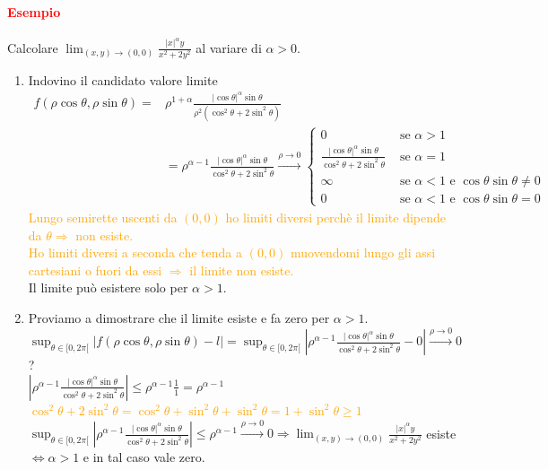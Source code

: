\documentclass{article}
\begin{document}
\paragraph{\textcolor{red}{Esempio}}
Calcolare $\lim_{(x,y)\rightarrow(0,0)}\frac{|x|^\alpha y}{x^2+2y^2}$ al variare di $\alpha >0$.
\begin{enumerate}
    \item Indovino il candidato valore limite
    \begin{align*}
        f(\rho\cos\theta,\rho\sin\theta)=&\rho^{1+\alpha}\frac{|\cos\theta|^\alpha\sin\theta}{\rho^2(\cos^2\theta+2\sin^2\theta)}\\
        &=\rho^{\alpha-1}\frac{|\cos\theta|^\alpha \sin\theta}{\cos^2\theta+2\sin^2\theta}\xrightarrow{\rho\rightarrow0}\begin{cases}
        0 &\text{  se  } \alpha > 1\\
         \frac{|\cos\theta|^\alpha \sin \theta}{\cos^2\theta+2\sin^2\theta}&\text{  se  } \alpha=1\\
        \infty &\text{  se  } \alpha < 1 \text{  e   } \cos\theta \sin\theta \neq 0\\
        0 &\text{  se  } \alpha < 1  \text{  e   } \cos\theta \sin\theta = 0
    \end{cases}
    \end{align*}
\textcolor{orange}{Lungo semirette uscenti da $(0,0)$ ho limiti diversi perchè il limite dipende da $\theta \Rightarrow$ non esiste.\\Ho limiti diversi a seconda che tenda a $(0,0)$ muovendomi lungo gli assi cartesiani o fuori da essi $\Rightarrow$ il limite non esiste.}\\
Il limite può esistere solo per $\alpha > 1$.
\item Proviamo a dimostrare che il limite esiste e fa zero per $\alpha >1$.\\
$\sup_{\theta \in [0,2\pi[}|f(\rho\cos\theta,\rho\sin\theta)-l|=\sup_{\theta \in [0,2\pi[}|\rho^{\alpha-1}\frac{|\cos \theta|^\alpha \sin\theta}{\cos^2\theta+2\sin^2\theta}-0|\xrightarrow{\rho\rightarrow0}0$?\\
$ |\rho^{\alpha-1}\frac{|\cos \theta|^\alpha \sin\theta}{\cos^2\theta+2\sin^2\theta}| \leq \rho^{\alpha-1}\frac{1}{1}=\rho^{\alpha-1}$\\
\textcolor{orange}{$\cos^2\theta+2\sin^2\theta=\cos^2\theta+\sin^2\theta+\sin^2\theta=1+\sin^2\theta \geq 1$}\\
$\sup_{\theta \in [0,2\pi[}|\rho^{\alpha-1}\frac{|\cos\theta|^\alpha\sin\theta}{\cos^2\theta+2\sin^2\theta}|\leq \rho^{\alpha-1}\xrightarrow{\rho\rightarrow0}0 \Rightarrow \lim_{(x,y)\rightarrow(0,0)}\frac{|x|^\alpha y}{x^2+2y^2}$ esiste $\Leftrightarrow \alpha> 1$ e in tal caso vale zero. 
\end{enumerate}
\end{document}
